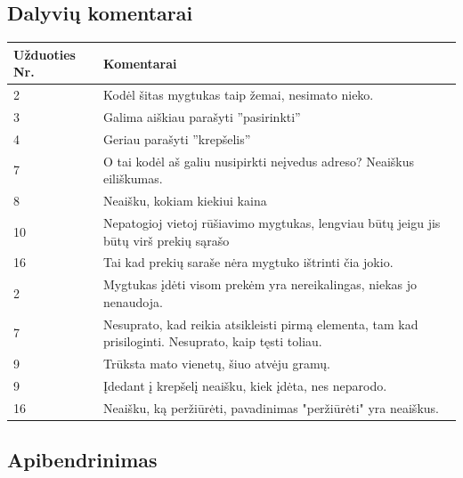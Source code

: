 \documentclass[oneside]{VUMIFPSkursinis}
\begin{document}
	\subsection{Dalyvių komentarai}
\begin{center}
    \begin{tabular}{ |p{3cm}| p{12cm} |}
    \hline
	Užduoties Nr.&Komentarai\\ \hline
	2&Kodėl šitas mygtukas taip žemai, nesimato nieko.\\ \hline
	3&Galima aiškiau parašyti ''pasirinkti''\\ \hline
	4&Geriau parašyti ''krepšelis''\\ \hline
	7&O tai kodėl aš galiu nusipirkti neįvedus adreso? Neaiškus eiliškumas.\\ \hline
	8&Neaišku, kokiam kiekiui kaina\\ \hline
	10&Nepatogioj vietoj rūšiavimo mygtukas, lengviau būtų jeigu jis būtų virš prekių sąrašo\\ \hline
	16&Tai kad prekių saraše nėra mygtuko ištrinti čia jokio.\\ \hline
	2&Mygtukas įdėti visom prekėm yra nereikalingas, niekas jo nenaudoja.\\ \hline
	7&Nesuprato, kad reikia atsikleisti pirmą elementa, tam kad prisiloginti. Nesuprato, kaip tęsti toliau.\\ \hline
	9&Trūksta mato vienetų, šiuo atvėju gramų.\\ \hline
	9&Įdedant į krepšelį neaišku, kiek įdėta, nes neparodo.\\ \hline
	16&Neaišku, ką peržiūrėti, pavadinimas "peržiūrėti" yra neaiškus. \\ \hline
    \end{tabular}
\end{center}

\subsection{Apibendrinimas}
\end{document}

